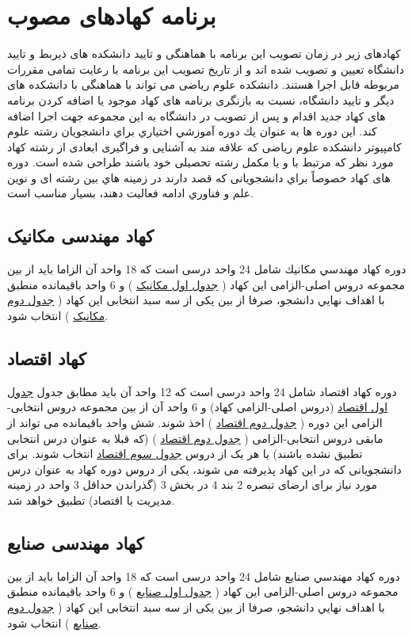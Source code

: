 \documentclass{article}
\begin{document}
\section{برنامه کهادهای مصوب}
کهادهای زیر در زمان تصویب این برنامه با هماهنگی و تایید دانشکده های ذیربط و تایید دانشگاه تعیین و تصویب شده اند و از تاریخ تصویب این برنامه با رعایت تمامی مقررات مربوطه قابل اجرا هستند. دانشکده علوم ریاضی می تواند با هماهنگی با دانشکده های دیگر و تایید دانشگاه، نسبت به بازنگری برنامه های کهاد موجود یا اضافه کردن برنامه های کهاد جدید اقدام و پس از تصویب در دانشگاه به این مجموعه جهت اجرا اضافه کند. 
این دوره ها به عنوان يك دوره آموزشي اختياري براي دانشجويان رشته علوم کامپیوتر دانشكده علوم ریاضی كه علاقه مند به آشنایی و فراگیری ابعادی از رشته کهاد مورد نظر که مرتبط با و یا مکمل رشته تحصیلی خود باشند طراحی شده است. دوره های کهاد خصوصاً براي دانشجویانی كه قصد دارند در زمینه هاي بین رشته ای و نوين علم و فناوري ادامه فعالیت دهند، بسيار مناسب است.


\subsection{
کهاد مهندسی مکانیک
}
دوره کهاد مهندسي مكانيك شامل 24 واحد درسی است که 18 واحد آن الزاما باید از بین مجموعه دروس اصلی-الزامی این کهاد (
\href{mech-t1}{جدول اول مکانیک}
) و 6 واحد باقیمانده منطبق با اهداف نهايي دانشجو، صرفا از بین یکی از سه سبد انتخابی این کهاد (
\href{mech-t2}{جدول دوم مکانیک}
) انتخاب شود.
\subsection{
کهاد اقتصاد
}
دوره کهاد اقتصاد شامل 24 واحد درسی است که  12 واحد آن باید مطابق جدول 
\href{eco-t1}{جدول اول اقتصاد}
 (دروس اصلی-الزامی کهاد) و 6 واحد آن از بین مجموعه دروس انتخابی-الزامی این دوره (
 \href{eco-t2}{جدول دوم اقتصاد}
 ) اخذ شوند. شش واحد باقیمانده می تواند از مابقی دروس انتخابی-الزامی ( 
 \href{eco-t2}{جدول دوم اقتصاد}
 )
 (که قبلا به عنوان درس انتخابی تطبیق نشده باشند) یا هر یک از دروس 
 \href{eco-t3}{جدول سوم اقتصاد}
 انتخاب شوند. برای دانشجویانی که در این کهاد پذیرفته می شوند، یکی از دروس دوره کهاد به عنوان درس مورد نیاز برای ارضای تبصره 2 بند 4 در بخش 3 (گذراندن حداقل 3 واحد در زمینه مدیریت یا اقتصاد) تطبیق خواهد شد.
\subsection{
کهاد مهندسی صنایع
}
دوره کهاد مهندسي صنایع شامل 24 واحد درسی است که 18 واحد آن الزاما باید از بین مجموعه دروس اصلی-الزامی این کهاد (
\href{ind-t1}{جدول اول صنایع}
) و 6 واحد باقیمانده منطبق با اهداف نهايي دانشجو، صرفا از بین یکی از سه سبد انتخابی این کهاد (
\href{ind-t2}{جدول دوم صنایع}
)
 انتخاب شود.
\end{document}
